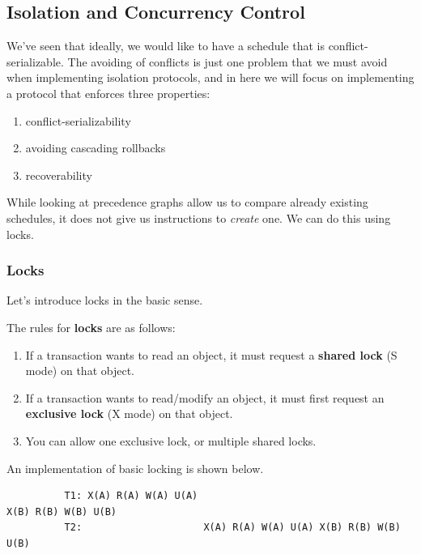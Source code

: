 \documentclass{article}
\begin{document}
  \subsection{Isolation and Concurrency Control} 

      We've seen that ideally, we would like to have a schedule that is conflict-serializable. The avoiding of conflicts is just one problem that we must avoid when implementing isolation protocols, and in here we will focus on implementing a protocol that enforces three properties: 
      \begin{enumerate}
        \item conflict-serializability 
        \item avoiding cascading rollbacks 
        \item recoverability
      \end{enumerate}
      While looking at precedence graphs allow us to compare already existing schedules, it does not give us instructions to \textit{create} one. We can do this using locks. 

    \subsubsection{Locks}

      Let's introduce locks in the basic sense. 

      \begin{definition}[Locks]
        The rules for \textbf{locks} are as follows: 
        \begin{enumerate}
          \item If a transaction wants to read an object, it must request a \textbf{shared lock} (S mode) on that object. 
          \item If a transaction wants to read/modify an object, it must first request an \textbf{exclusive lock} (X mode) on that object. 
          \item You can allow one exclusive lock, or multiple shared locks. 
        \end{enumerate}
      \end{definition}

      \begin{example}
        An implementation of basic locking is shown below. 
        \begin{lstlisting}
          T1: X(A) R(A) W(A) U(A)                                         X(B) R(B) W(B) U(B) 
          T2:                     X(A) R(A) W(A) U(A) X(B) R(B) W(B) U(B) 
        \end{lstlisting}
      \end{example}
\end{document}
